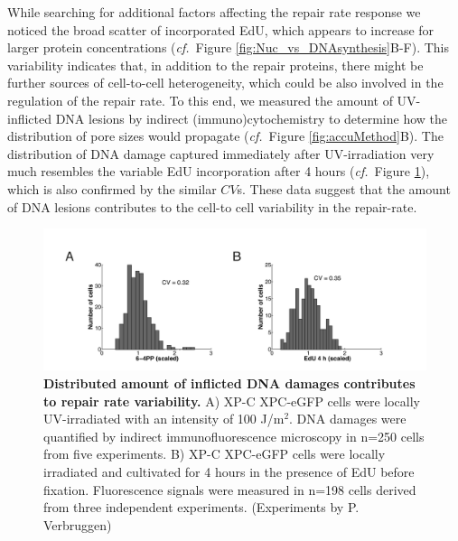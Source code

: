 While searching for additional factors affecting the repair rate response we noticed the broad scatter of incorporated EdU, which appears to increase for larger protein concentrations (\textit{cf.}\ Figure \ref{fig:Nuc_vs_DNAsynthesis}B-F). This variability indicates that, in addition to the repair proteins, there might be further sources of cell-to-cell heterogeneity, which could be also involved in the regulation of the repair rate. To this end, we measured the amount of UV-inflicted DNA lesions by indirect (immuno)cytochemistry to determine how the distribution of pore sizes would propagate (\textit{cf.}\ Figure \ref{fig:accuMethod}B). The distribution of DNA damage captured immediately after UV-irradiation very much resembles the variable EdU incorporation after 4 hours (\textit{cf.}\ Figure \ref{fig:DamageDist}), which is also confirmed by the similar $CV$s. These data suggest that the amount of DNA lesions contributes to the cell-to cell variability in the repair-rate.  


\begin{figure}[t!]
	\begin{center}
		\includegraphics[width=1\textwidth]{Abbildungen/figure3_5.pdf}
		\caption{\textbf{Distributed amount of inflicted DNA damages contributes to repair rate variability.} A) XP-C XPC-eGFP cells were locally UV-irradiated with an intensity of 100 J/$\text{m}^\text{2}$. DNA damages were quantified by indirect immunofluorescence microscopy in n=250 cells from five experiments. B) XP-C XPC-eGFP cells were locally irradiated and cultivated for 4 hours in the presence of EdU before fixation. Fluorescence signals were measured in n=198 cells derived from three independent experiments. (Experiments by P. Verbruggen)}
		\label{fig:DamageDist}
	\end{center}
\end{figure}

